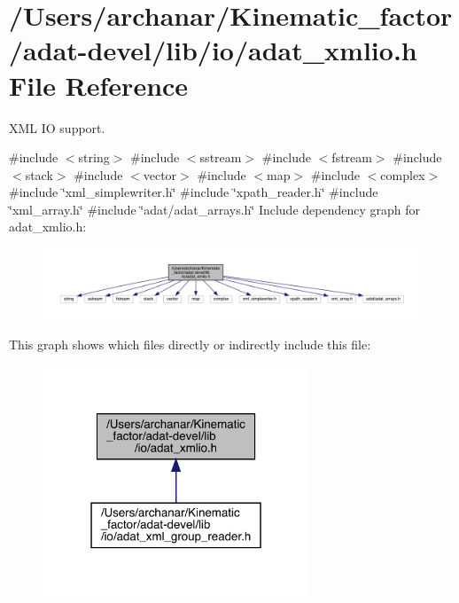 \hypertarget{adat-devel_2lib_2io_2adat__xmlio_8h}{}\section{/\+Users/archanar/\+Kinematic\+\_\+factor/adat-\/devel/lib/io/adat\+\_\+xmlio.h File Reference}
\label{adat-devel_2lib_2io_2adat__xmlio_8h}


X\+ML IO support.  


{\ttfamily \#include $<$string$>$}\newline
{\ttfamily \#include $<$sstream$>$}\newline
{\ttfamily \#include $<$fstream$>$}\newline
{\ttfamily \#include $<$stack$>$}\newline
{\ttfamily \#include $<$vector$>$}\newline
{\ttfamily \#include $<$map$>$}\newline
{\ttfamily \#include $<$complex$>$}\newline
{\ttfamily \#include \char`\"{}xml\+\_\+simplewriter.\+h\char`\"{}}\newline
{\ttfamily \#include \char`\"{}xpath\+\_\+reader.\+h\char`\"{}}\newline
{\ttfamily \#include \char`\"{}xml\+\_\+array.\+h\char`\"{}}\newline
{\ttfamily \#include \char`\"{}adat/adat\+\_\+arrays.\+h\char`\"{}}\newline
Include dependency graph for adat\+\_\+xmlio.\+h\+:
\nopagebreak
\begin{figure}[H]
\begin{center}
\leavevmode
\includegraphics[width=350pt]{d4/d69/adat-devel_2lib_2io_2adat__xmlio_8h__incl}
\end{center}
\end{figure}
This graph shows which files directly or indirectly include this file\+:
\nopagebreak
\begin{figure}[H]
\begin{center}
\leavevmode
\includegraphics[width=223pt]{d2/de9/adat-devel_2lib_2io_2adat__xmlio_8h__dep__incl}
\end{center}
\end{figure}
